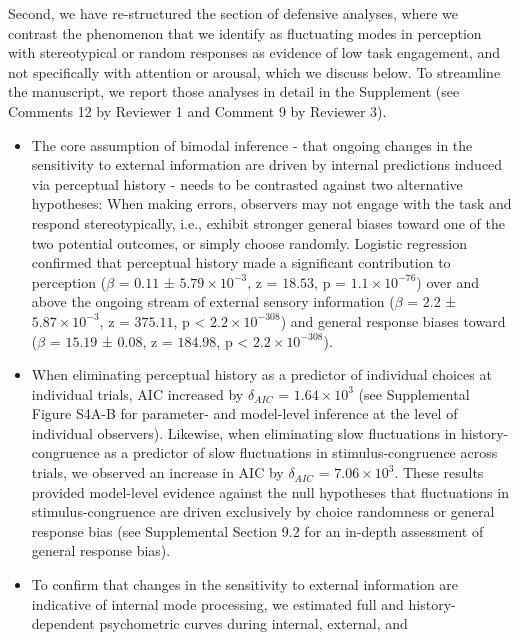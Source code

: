 \documentclass[
]{article}
\begin{document}
Second, we have re-structured the section of defensive analyses, where
we contrast the phenomenon that we identify as fluctuating modes in
perception with stereotypical or random responses as evidence of low
task engagement, and not specifically with attention or arousal, which
we discuss below. To streamline the manuscript, we report those analyses
in detail in the Supplement (see Comments 12 by Reviewer 1 and Comment 9
by Reviewer 3).

\begin{itemize}
\item
  The core assumption of bimodal inference - that ongoing changes in the
  sensitivity to external information are driven by internal predictions
  induced via perceptual history - needs to be contrasted against two
  alternative hypotheses: When making errors, observers may not engage
  with the task and respond stereotypically, i.e., exhibit stronger
  general biases toward one of the two potential outcomes, or simply
  choose randomly. Logistic regression confirmed that perceptual history
  made a significant contribution to perception (\(\beta\) = \(0.11\) ±
  \(\ensuremath{5.79\times 10^{-3}}\), z = \(18.53\), p =
  \(\ensuremath{1.1\times 10^{-76}}\)) over and above the ongoing stream
  of external sensory information (\(\beta\) = \(2.2\) ±
  \(\ensuremath{5.87\times 10^{-3}}\), z = \(375.11\), p < \(\ensuremath{2.2\times 10^{-308}}\)) and
  general response biases toward (\(\beta\) = \(15.19\) ± \(0.08\), z =
  \(184.98\), p < \(\ensuremath{2.2\times 10^{-308}}\)).
\item
  When eliminating perceptual history as a predictor of individual
  choices at individual trials, AIC increased by \(\delta_{AIC}\) =
  \(\ensuremath{1.64\times 10^{3}}\) (see Supplemental Figure S4A-B for
  parameter- and model-level inference at the level of individual
  observers). Likewise, when eliminating slow fluctuations in
  history-congruence as a predictor of slow fluctuations in
  stimulus-congruence across trials, we observed an increase in AIC by
  \(\delta_{AIC}\) = \(\ensuremath{7.06\times 10^{3}}\). These results
  provided model-level evidence against the null hypotheses that
  fluctuations in stimulus-congruence are driven exclusively by choice
  randomness or general response bias (see Supplemental Section 9.2 for
  an in-depth assessment of general response bias).
\item
  To confirm that changes in the sensitivity to external information are
  indicative of internal mode processing, we estimated full and
  history-dependent psychometric curves during internal, external, and

\end{itemize}
\end{document}

